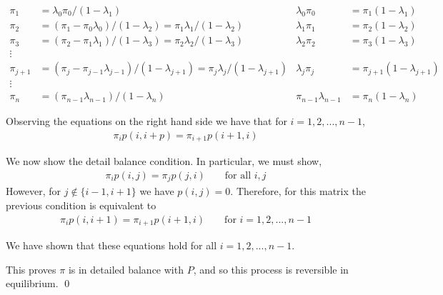 \begin{solution}[Solution]
\begin{align*}
    \pi_1 &= \lambda_0\pi_0 / (1-\lambda_1) 
        & \lambda_0\pi_0 &= \pi_1(1-\lambda_1) \\
    \pi_2 &= (\pi_1-\pi_0\lambda_0)/(1-\lambda_2) = \pi_1\lambda_1/(1-\lambda_2) 
        & \lambda_1\pi_1 &= \pi_2(1-\lambda_2) \\
    \pi_3 &= (\pi_2-\pi_1\lambda_1)/(1-\lambda_3) = \pi_2\lambda_2/(1-\lambda_3) 
        & \lambda_2\pi_2 &= \pi_3(1-\lambda_3) \\
    \vdots \\
    \pi_{j+1} &= (\pi_j-\pi_{j-1}\lambda_{j-1})/(1-\lambda_{j+1}) = \pi_j\lambda_j/(1-\lambda_{j+1}) & \lambda_j\pi_j &= \pi_{j+1}(1-\lambda_{j+1})\\
    \vdots \\
    \pi_n &= (\pi_{n-1}\lambda_{n-1})/(1-\lambda_n) 
        & \pi_{n-1}\lambda_{n-1} &= \pi_n(1-\lambda_n)
\end{align*}

Observing the equations on the right hand side we have that for \( i=1,2,...,n-1 \),
\begin{align*}
    \pi_{i}p(i,i+p) = \pi_{i+1}p(i+1,i)
\end{align*}

We now show the detail balance condition. In particular, we must show, 
\begin{align*}
    \pi_ip(i,j) = \pi_jp(j,i)  &&\text{ for all } i,j 
\end{align*}
However, for \( j\notin\{i-1,i+1\} \) we have \( p(i,j)=0 \). Therefore, for this matrix the previous condition is equivalent to 
\begin{align*}
    \pi_i p(i,i+1) = \pi_{i+1}p(i+1,i) &&\text{ for } i=1,2,..., n-1
\end{align*}

We have shown that these equations hold for all \( i=1,2,...,n-1 \). 

This proves \( \pi \) is in detailed balance with \( P \), and so this process is reversible in equilibrium. \qed

\end{solution}

